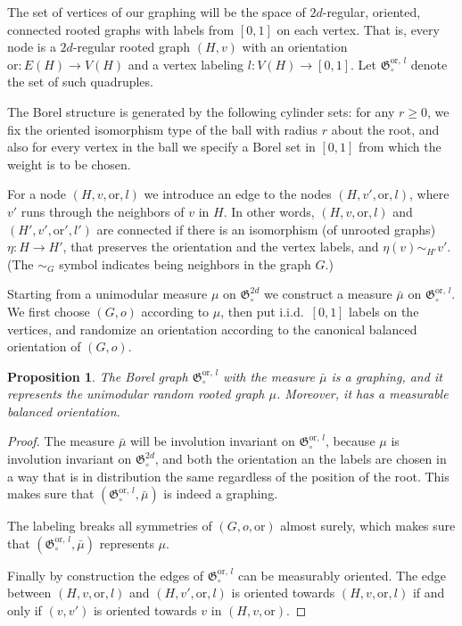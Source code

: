 \documentclass[11pt]{article}
\newtheorem{prop}[theo]{Proposition}
\theoremstyle{definition}
\numberwithin{equation}{section}
\numberwithin{figure}{section}
\numberwithin{table}{section}
\newcommand{\GoG}{\mathfrak{G}}
\newcommand{\orl}{\mathrm{or}}
\begin{document}
The set of vertices of our graphing will be the space of $2d$-regular, oriented, connected rooted graphs with labels from $[0,1]$ on each vertex. That is, every node is a $2d$-regular rooted graph $(H,v)$ with an orientation $\orl: E(H) \to V(H)$ and a vertex labeling $l: V(H) \to [0,1]$. Let $\GoG^{\orl,\,l}_{\circ}$ denote the set of such quadruples.

The Borel structure is generated by the following cylinder sets: for any $r \geq 0$, we fix the oriented isomorphism type of the ball with radius $r$ about the root, and also for every vertex in the ball we specify a Borel set in $[0, 1]$ from which the weight is to be chosen.

For a node $(H,v,\orl, l)$ we introduce an edge to the nodes $(H,v',\orl, l)$, where $v'$ runs through the neighbors of $v$ in $H$. In other words, $(H,v,\orl, l)$ and $(H',v',\orl ', l')$ are connected if there is an isomorphism (of unrooted graphs) $\eta: H \to H'$, that preserves the orientation and the vertex labels, and $\eta(v) \sim_{H'} v'$. (The $\sim_G$ symbol indicates being neighbors in the graph $G$.)

Starting from a unimodular measure $\mu$ on $\GoG_{\circ}^{2d}$ we construct a measure $\bar{\mu}$ on $\GoG^{\orl,\,l}_{\circ}$. We first choose $(G,o)$ according to $\mu$, then put i.i.d.\ $[0,1]$ labels on the vertices, and randomize an orientation according to the canonical balanced orientation of $(G,o)$.

\begin{prop}\label{proposition:orientable_graphing}
The Borel graph $\GoG^{\orl,\,l}_{\circ}$ with the measure $\bar{\mu}$ is a graphing, and it represents the unimodular random rooted graph $\mu$. Moreover, it has a measurable balanced orientation.
\end{prop}

\begin{proof}
The measure $\bar{\mu}$ will be involution invariant on $\GoG^{\orl,\,l}_{\circ}$, because $\mu$ is involution invariant on $\GoG_{\circ}^{2d}$, and both the orientation an the labels are chosen in a way that is in distribution the same regardless of the position of the root. This makes sure that $(\GoG^{\orl,\,l}_{\circ}, \bar{\mu})$ is indeed a graphing.

The labeling breaks all symmetries of $(G,o, \orl)$ almost surely, which makes sure that $(\GoG^{\orl,\,l}_{\circ}, \bar{\mu})$ represents $\mu$.

Finally by construction the edges of $\GoG^{\orl,\,l}_{\circ}$ can be measurably oriented. The edge between $(H,v,\orl, l)$ and $(H,v',\orl, l)$ is oriented towards $(H,v,\orl, l)$ if and only if $(v,v')$ is oriented towards $v$ in $(H,v,\orl)$.
\end{proof}
\end{document}
